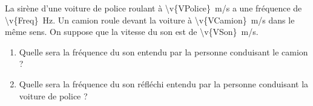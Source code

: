 La sirène d’une voiture de police roulant à \qty{\v{VPolice}}{m/s} a une fréquence de \qty{\v{Freq}}{Hz}. Un camion roule devant la voiture à \qty{\v{VCamion}}{m/s} dans le même sens. On suppose que la vitesse du son est de \qty{\v{VSon}}{m/s}.

\begin{enumerate}[label=\alph*)]
    \item Quelle sera la fréquence du son entendu par la personne conduisant le camion ?
    \item Quelle sera la fréquence du son réfléchi entendu par la personne conduisant la voiture de police ?
\end{enumerate}